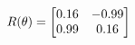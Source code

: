 \documentclass[preview]{standalone}
\begin{document}
\begin{align*}
\special{dvisvgm:raw <g id='unique000'>}R(\theta) = \begin{bmatrix}0.16 & -0.99\\0.99 & 0.16\end{bmatrix}\special{dvisvgm:raw </g>}
\end{align*}
\end{document}
